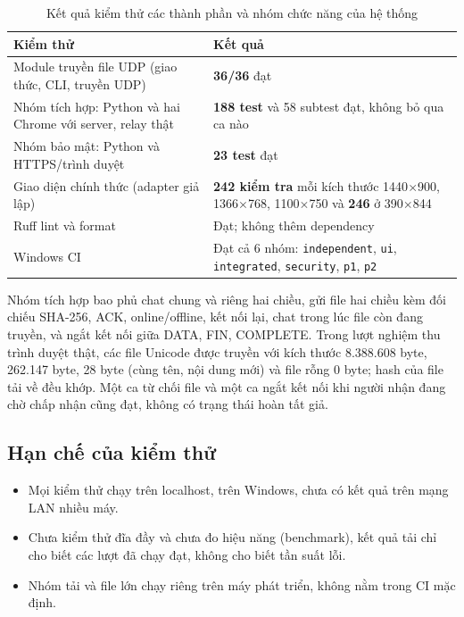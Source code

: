 \begin{table}[htbp]
    \centering
    \small
    \renewcommand{\arraystretch}{1.4}
    \begin{tabularx}{\textwidth}{
        @{}
        >{\raggedright\arraybackslash}p{5cm}
        >{\raggedright\arraybackslash}X
        @{}
    }
        \toprule
        \textbf{Kiểm thử} & \textbf{Kết quả} \\
        \midrule
        Module truyền file UDP (giao thức, CLI, truyền UDP)
        & \textbf{36/36} đạt \\

        Nhóm tích hợp: Python và hai Chrome với server, relay thật
        & \textbf{188 test} và 58 subtest đạt, không bỏ qua ca nào \\

        Nhóm bảo mật: Python và HTTPS/trình duyệt
        & \textbf{23 test} đạt \\

        Giao diện chính thức (adapter giả lập)
        & \textbf{242 kiểm tra} mỗi kích thước 1440$\times$900, 1366$\times$768, 1100$\times$750 và \textbf{246} ở 390$\times$844 \\

        Ruff lint và format
        & Đạt; không thêm dependency \\

        Windows CI
        & Đạt cả 6 nhóm: \texttt{independent}, \texttt{ui}, \texttt{integrated}, \texttt{security}, \texttt{p1}, \texttt{p2} \\
        \bottomrule
    \end{tabularx}
    \caption{Kết quả kiểm thử các thành phần và nhóm chức năng của hệ thống}
\end{table}

Nhóm tích hợp bao phủ chat chung và riêng hai chiều, gửi file hai chiều kèm đối chiếu SHA-256, ACK, online/offline, kết nối lại, chat trong lúc file còn đang truyền, và ngắt kết nối giữa DATA, FIN, COMPLETE. Trong lượt nghiệm thu trình duyệt thật, các file Unicode được truyền với kích thước 8.388.608 byte, 262.147 byte, 28 byte (cùng tên, nội dung mới) và file rỗng 0 byte; hash của file tải về đều khớp. Một ca từ chối file và một ca ngắt kết nối khi người nhận đang chờ chấp nhận cũng đạt, không có trạng thái hoàn tất giả.

\subsection{Hạn chế của kiểm thử}
\begin{itemize}
    \item Mọi kiểm thử chạy trên localhost, trên Windows, chưa có kết quả trên mạng LAN nhiều máy.
    \item Chưa kiểm thử đĩa đầy và chưa đo hiệu năng (benchmark), kết quả tải chỉ cho biết các lượt đã chạy đạt, không cho biết tần suất lỗi.
    \item Nhóm tải và file lớn chạy riêng trên máy phát triển, không nằm trong CI mặc định.
\end{itemize}